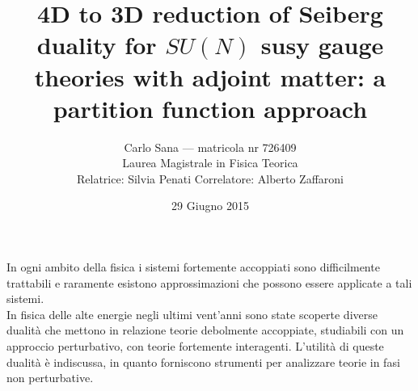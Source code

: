 \documentclass[a4paper,12pt]{article}
\author{
 Carlo Sana  --- matricola nr 726409 \\
 Laurea Magistrale in Fisica Teorica\\
Relatrice: Silvia Penati 
Correlatore: Alberto Zaffaroni\\
}
\date{29 Giugno 2015}
\title{ \textbf{4D to 3D reduction of Seiberg duality for $SU(N)$ susy gauge theories with adjoint matter: a partition function approach }}
\begin{document}
\maketitle
In ogni ambito della fisica i sistemi fortemente accoppiati sono difficilmente trattabili e raramente esistono approssimazioni che possono essere applicate a tali sistemi.
\\
In fisica delle alte energie negli ultimi vent'anni sono state scoperte diverse dualità che mettono in relazione teorie debolmente accoppiate, studiabili con un approccio perturbativo, con teorie fortemente interagenti.
L'utilità di queste dualità è indiscussa, in quanto forniscono strumenti per analizzare teorie in fasi non perturbative. 
\end{document}
